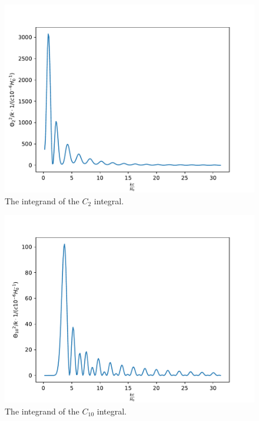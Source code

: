 \documentclass{aa}
\begin{document}
\begin{figure}[H]
   \includegraphics[scale=0.6]{../figures/milestone4/theta_2_squared.pdf}
   \caption{The integrand of the $C_{2}$ integral.}\label{fig:m4_theta2_squared}
\end{figure}

\begin{figure}[H]
   \includegraphics[scale=0.6]{../figures/milestone4/theta_10_squared.pdf}
   \caption{The integrand of the $C_{10}$ integral.}\label{fig:m4_theta10_squared}
\end{figure}
\end{document}
